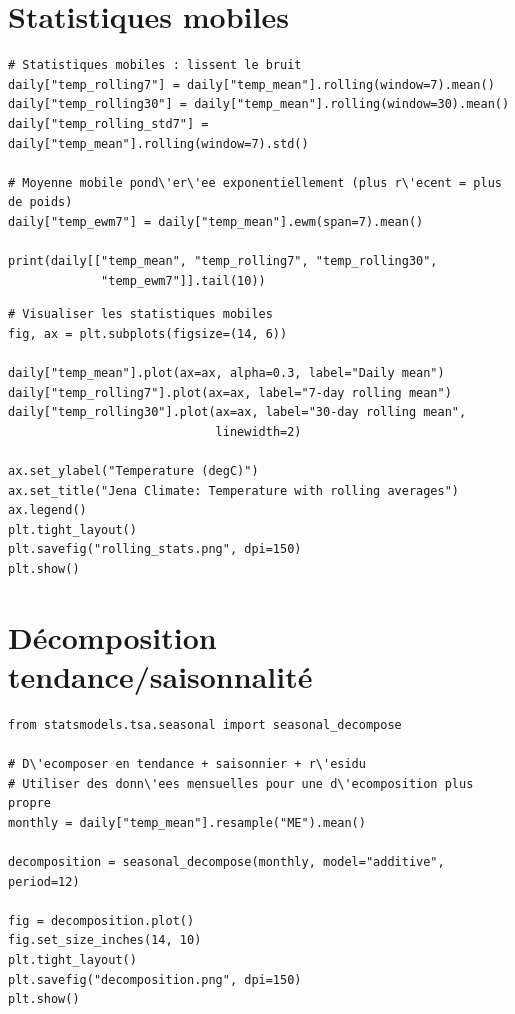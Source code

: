 \section{Statistiques mobiles}

\begin{verbatim}
# Statistiques mobiles : lissent le bruit
daily["temp_rolling7"] = daily["temp_mean"].rolling(window=7).mean()
daily["temp_rolling30"] = daily["temp_mean"].rolling(window=30).mean()
daily["temp_rolling_std7"] = daily["temp_mean"].rolling(window=7).std()

# Moyenne mobile pond\'er\'ee exponentiellement (plus r\'ecent = plus de poids)
daily["temp_ewm7"] = daily["temp_mean"].ewm(span=7).mean()

print(daily[["temp_mean", "temp_rolling7", "temp_rolling30",
             "temp_ewm7"]].tail(10))
\end{verbatim}

\begin{verbatim}
# Visualiser les statistiques mobiles
fig, ax = plt.subplots(figsize=(14, 6))

daily["temp_mean"].plot(ax=ax, alpha=0.3, label="Daily mean")
daily["temp_rolling7"].plot(ax=ax, label="7-day rolling mean")
daily["temp_rolling30"].plot(ax=ax, label="30-day rolling mean",
                             linewidth=2)

ax.set_ylabel("Temperature (degC)")
ax.set_title("Jena Climate: Temperature with rolling averages")
ax.legend()
plt.tight_layout()
plt.savefig("rolling_stats.png", dpi=150)
plt.show()
\end{verbatim}

\section{D\'ecomposition tendance/saisonnalit\'e}

\begin{verbatim}
from statsmodels.tsa.seasonal import seasonal_decompose

# D\'ecomposer en tendance + saisonnier + r\'esidu
# Utiliser des donn\'ees mensuelles pour une d\'ecomposition plus propre
monthly = daily["temp_mean"].resample("ME").mean()

decomposition = seasonal_decompose(monthly, model="additive", period=12)

fig = decomposition.plot()
fig.set_size_inches(14, 10)
plt.tight_layout()
plt.savefig("decomposition.png", dpi=150)
plt.show()
\end{verbatim}

